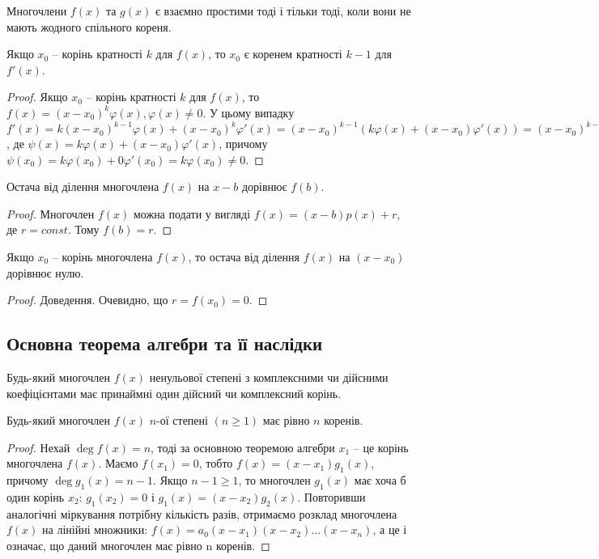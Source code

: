 \begin{claim}
	Многочлени $f(x)$ та $g(x)$ є взаємно простими тоді і тільки тоді, коли
	вони не мають жодного спільного кореня.
\end{claim}

\begin{claim}
	Якщо $x_0$ -- корінь кратності $k$ для $f(x)$, то $x_0$ є коренем кратності $k-1$
	для $f'(x)$.
\end{claim}
\begin{proof}
	Якщо $x_0$ -- корінь кратності $k$ для $f(x)$, то $f(x) = (x-x_0)^k\varphi(x), \varphi(x) \neq 0$.
	У цьому випадку $f'(x) = k(x-x_0)^{k-1}\varphi(x) + (x-x_0)^k\varphi'(x) = (x-x_0)^{k-1}(k\varphi(x)
	+ (x-x_0)\varphi'(x)) = (x-x_0)^{k-1}\psi(x)$, де $\psi(x) = k\varphi(x) + (x-x_0)\varphi'(x)$,
	причому $\psi(x_0) = k\varphi(x_0) + 0 \varphi'(x_0) = k\varphi(x_0) \neq 0$.
\end{proof}

\begin{theorem}
	Остача від ділення многочлена $f(x)$ на $x-b$ дорівнює $f(b)$.
\end{theorem}
\begin{proof}
	Многочлен $f(x)$ можна подати у вигляді $f(x) =  (x-b)p(x) + r$,
	де $r = const$. Тому $f(b) = r$.
\end{proof}

\begin{corollary}
	Якщо $x_0$ -- корінь многочлена $f(x)$, то остача від ділення $f(x)$ на
	$(x - x_0)$ дорівнює нулю.
\end{corollary}
\begin{proof}
	Доведення. Очевидно, що $r = f(x_0) = 0$. 
\end{proof}

\subsection{Основна теорема алгебри та її наслідки}

\begin{theorem}
	Будь-який многочлен $f(x)$ ненульової степені з комплексними чи
	дійсними коефіцієнтами має принаймні один дійсний чи комплексний корінь.
\end{theorem}

\begin{corollary}
	Будь-який многочлен $f(x)$ $n$-ої степені $(n \geqslant 1)$ має рівно $n$ коренів.
\end{corollary}
\begin{proof}
	Нехай $\deg f(x) = n$, тоді за основною теоремою алгебри $x_1$ -- це
	корінь многочлена $f(x)$. Маємо $f(x_1) = 0$, тобто $f(x) = (x - x_1)g_1(x)$, причому
	$\deg g_1(x) = n-1$. Якщо $n - 1 \geqslant 1$, то многочлен $g_1(x)$ має хоча б один корінь $x_2$:
	$g_1(x_2) = 0$ і $g_1(x) = (x - x_2)g_2(x)$. Повторивши аналогічні міркування потрібну
	кількість разів, отримаємо розклад многочлена $f(x)$ на лінійні множники:
	$f(x) = a_0(x-x_1)(x-x_2)...(x-x_n)$,
	а це і означає, що даний многочлен має рівно n коренів.
\end{proof}

